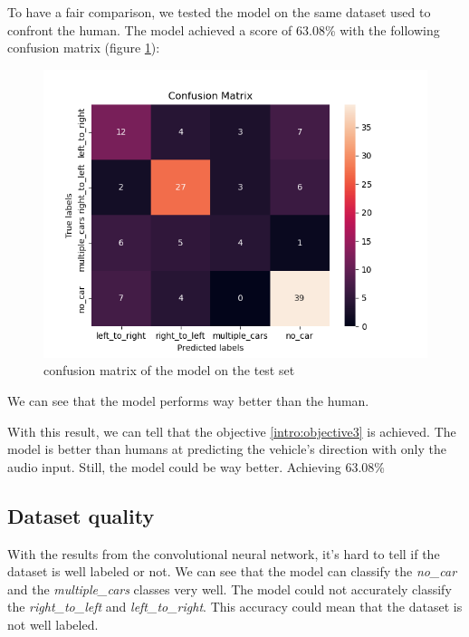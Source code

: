 To have a fair comparison, we tested the model on the same dataset used to confront the human. The model achieved a score of 63.08\% with the following confusion matrix (figure \ref{fig:model_score_only_audio}):

\begin{figure}[H]
    \centering
    \includegraphics[width=1\textwidth]{images/model_score_only_audio.png}
    \caption{confusion matrix of the model on the test set}
    \label{fig:model_score_only_audio}
\end{figure}

We can see that the model performs way better than the human. 

With this result, we can tell that the objective \ref{intro:objective3} is achieved. The model is better than humans at predicting the vehicle's direction with only the audio input. Still, the model could be way better. Achieving 63.08\% %

\subsection{Dataset quality}

With the results from the convolutional neural network, it's hard to tell if the dataset is well labeled or not. We can see that the model can classify the \textit{no\_car} and the \textit{multiple\_cars} classes very well. The model could not accurately classify the \textit{right\_to\_left} and \textit{left\_to\_right}. This accuracy could mean that the dataset is not well labeled.

